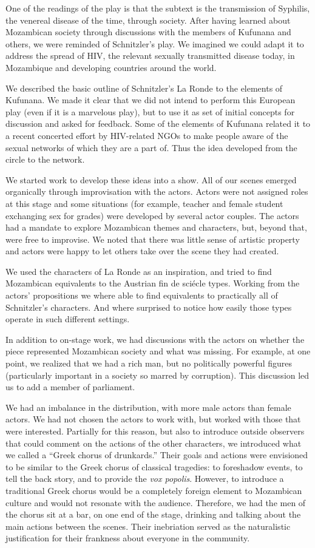 \documentclass[article,twocolumn]{memoir}
\begin{document}
One of the readings of the play is that the subtext is the transmission of
Syphilis, the venereal disease of the time, through society. After having
learned about Mozambican society through discussions with the members of
Kufunana and others, we were reminded of Schnitzler's play. We imagined we
could adapt it to address the spread of HIV, the relevant sexually transmitted
disease today, in Mozambique and developing countries around the world.

We described the basic outline of Schnitzler's La Ronde to the elements of
Kufunana. We made it clear that we did not intend to perform this European play
(even if it is a marvelous play), but to use it as set of initial concepts for
discussion and asked for feedback. Some of the elements of Kufunana related it
to a recent concerted effort by HIV-related NGOs to make people aware of the
sexual networks of which they are a part of. Thus the idea developed from the
circle to the network.

We started work to develop these ideas into a show. All of our scenes emerged
organically through improvisation with the actors. Actors were not assigned
roles at this stage and some situations (for example, teacher and female student
exchanging sex for grades) were developed by several actor couples. The actors
had a mandate to explore Mozambican themes and characters, but, beyond that,
were free to improvise. We noted that there was little sense of artistic
property and actors were happy to let others take over the scene they had
created.

We used the characters of La Ronde as an inspiration, and tried to find
Mozambican equivalents to the Austrian fin de sci\'{e}cle types. Working from
the actors' propositions we where able to find equivalents to practically all
of Schnitzler's characters. And where surprised to notice how easily those
types operate in such different settings.

In addition to on-stage work, we had discussions with the actors on whether the
piece represented Mozambican society and what was missing. For example, at one
point, we realized that we had a rich man, but no politically powerful figures
(particularly important in a society so marred by corruption). This discussion
led us to add a member of parliament.

We had an imbalance in the distribution, with more male actors than female
actors. We had not chosen the actors to work with, but worked with those that
were interested. Partially for this reason, but also to introduce outside
observers that could comment on the actions of the other characters, we
introduced what we called a ``Greek chorus of drunkards.'' Their goals and
actions were envisioned to be similar to the Greek chorus of classical
tragedies: to foreshadow events, to tell the back story, and to provide the
\textit{vox popolis}. However, to introduce a traditional Greek chorus would be a
completely foreign element to Mozambican culture and would not resonate with
the audience. Therefore, we had the men of the chorus sit at a bar, on one end
of the stage, drinking and talking about the main actions between the scenes.
Their inebriation served as the naturalistic justification for their frankness
about everyone in the community.
\end{document}

